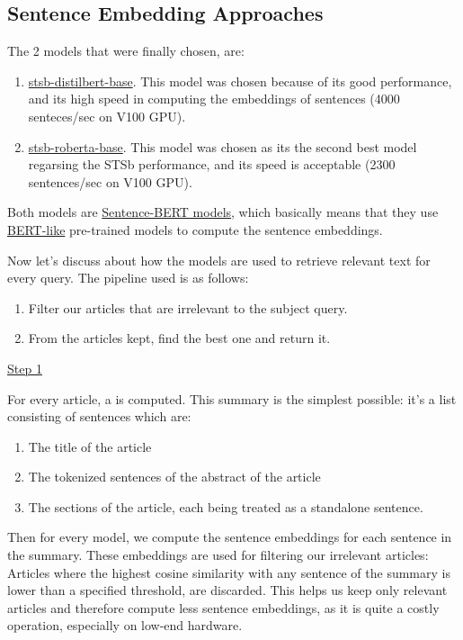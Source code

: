 \documentclass[12pt]{report}
\begin{document}
\subsection*{Sentence Embedding Approaches}
The 2 models that were finally chosen, are:
\begin{enumerate}
    \item \href{https://arxiv.org/pdf/1910.01108.pdf}{stsb-distilbert-base}.
        This model was chosen because of its good performance, and its high speed in computing the
        embeddings of sentences (4000 senteces/sec on V100 GPU).
    \item \href{https://arxiv.org/pdf/1907.11692.pdf}{stsb-roberta-base}. This model was chosen as
        its the second best model regarsing the STSb performance, and its speed is acceptable
        (2300 sentences/sec on V100 GPU).
\end{enumerate}
Both models are \href{https://arxiv.org/pdf/1908.10084.pdf}{Sentence-BERT models}, which basically
means that they use \href{https://arxiv.org/pdf/1810.04805.pdf}{BERT-like} pre-trained models to
compute the sentence embeddings.
\bigskip

Now let's discuss about how the models are used to retrieve relevant text for every query.
The pipeline used is as follows:
\begin{enumerate}
    \item Filter our articles that are irrelevant to the subject query.
    \item From the articles kept, find the best one and return it.
\end{enumerate} \smallskip

\noindent\underline{Step 1} \bigskip

\noindent For every article, a  is computed. This summary is the
simplest possible: it's a list consisting of sentences which are:
\begin{enumerate}
    \item The title of the article
    \item The tokenized sentences of the abstract of the article
    \item The sections of the article, each being treated as a standalone sentence.
\end{enumerate}
Then for every model, we compute the sentence embeddings for each sentence in the summary.
These embeddings are used for filtering our irrelevant articles: Articles where the highest
cosine similarity with any sentence of the summary is lower than a specified threshold,
are discarded. This helps us keep only relevant articles and therefore compute less sentence
embeddings, as it is quite a costly operation, especially on low-end hardware.
\clearpage
\end{document}
